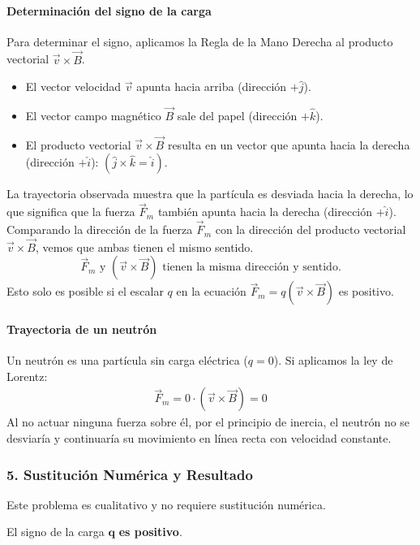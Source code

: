 \paragraph*{Determinación del signo de la carga}
Para determinar el signo, aplicamos la Regla de la Mano Derecha al producto vectorial $\vec{v} \times \vec{B}$.
\begin{itemize}
    \item El vector velocidad $\vec{v}$ apunta hacia arriba (dirección $+\hat{j}$).
    \item El vector campo magnético $\vec{B}$ sale del papel (dirección $+\hat{k}$).
    \item El producto vectorial $\vec{v} \times \vec{B}$ resulta en un vector que apunta hacia la derecha (dirección $+\hat{i}$): $(\hat{j} \times \hat{k} = \hat{i})$.
\end{itemize}
La trayectoria observada muestra que la partícula es desviada hacia la derecha, lo que significa que la fuerza $\vec{F}_m$ también apunta hacia la derecha (dirección $+\hat{i}$).
Comparando la dirección de la fuerza $\vec{F}_m$ con la dirección del producto vectorial $\vec{v} \times \vec{B}$, vemos que ambas tienen el mismo sentido.
$$ \vec{F}_m \text{ y } (\vec{v} \times \vec{B}) \text{ tienen la misma dirección y sentido.} $$
Esto solo es posible si el escalar $q$ en la ecuación $\vec{F}_m = q(\vec{v} \times \vec{B})$ es positivo.

\paragraph*{Trayectoria de un neutrón}
Un neutrón es una partícula sin carga eléctrica ($q=0$). Si aplicamos la ley de Lorentz:
\begin{gather}
    \vec{F}_m = 0 \cdot (\vec{v} \times \vec{B}) = 0
\end{gather}
Al no actuar ninguna fuerza sobre él, por el principio de inercia, el neutrón no se desviaría y continuaría su movimiento en línea recta con velocidad constante.

\subsubsection*{5. Sustitución Numérica y Resultado}
Este problema es cualitativo y no requiere sustitución numérica.
\begin{cajaresultado}
    El signo de la carga $\boldsymbol{q}$ \textbf{es positivo}.
\end{cajaresultado}

